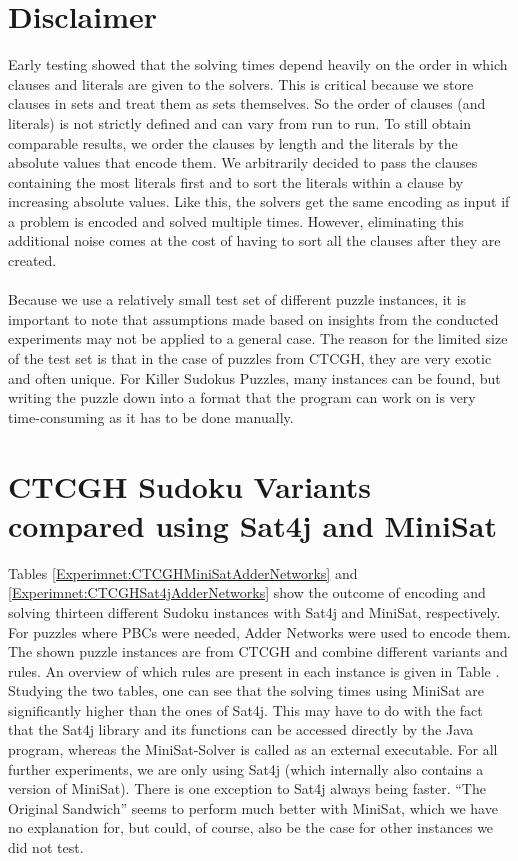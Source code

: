 \section{Disclaimer}
Early testing showed that the solving times depend heavily on the order in which clauses and literals are given to the solvers. This is critical because we store clauses in sets and treat them as sets themselves. So the order of clauses (and literals) is not strictly defined and can vary from run to run. To still obtain comparable results, we order the clauses by length and the literals by the absolute values that encode them. We arbitrarily decided to pass the clauses containing the most literals first and to sort the literals within a clause by increasing absolute values. Like this, the solvers get the same encoding as input if a problem is encoded and solved multiple times. However, eliminating this additional noise comes at the cost of having to sort all the clauses after they are created.\\
\\
Because we use a relatively small test set of different puzzle instances, it is important to note that assumptions made based on insights from the conducted experiments may not be applied to a general case. The reason for the limited size of the test set is that in the case of puzzles from CTCGH, they are very exotic and often unique. For Killer Sudokus Puzzles, many instances can be found, but writing the puzzle down into a format that the program can work on is very time-consuming as it has to be done manually.

\section{CTCGH Sudoku Variants compared using Sat4j and MiniSat}
Tables \ref{Experimnet:CTCGHMiniSatAdderNetworks} and \ref{Experimnet:CTCGHSat4jAdderNetworks} show the  outcome of encoding and solving thirteen different Sudoku instances with Sat4j and MiniSat, respectively. For puzzles where PBCs were needed, Adder Networks were used to encode them. The shown puzzle instances are from CTCGH and combine different variants and rules. An overview of which rules are present in each instance is given in Table .\\

Studying the two tables, one can see that the solving times using MiniSat are significantly higher than the ones of Sat4j. This may have to do with the fact that the Sat4j library and its functions can be accessed directly by the Java program, whereas the MiniSat-Solver is called as an external executable. For all further experiments, we are only using Sat4j (which internally also contains a version of MiniSat). There is one exception to Sat4j always being faster. ``The Original Sandwich'' seems to perform much better with MiniSat, which we have no explanation for, but could, of course, also be the case for other instances we did not test.\\

